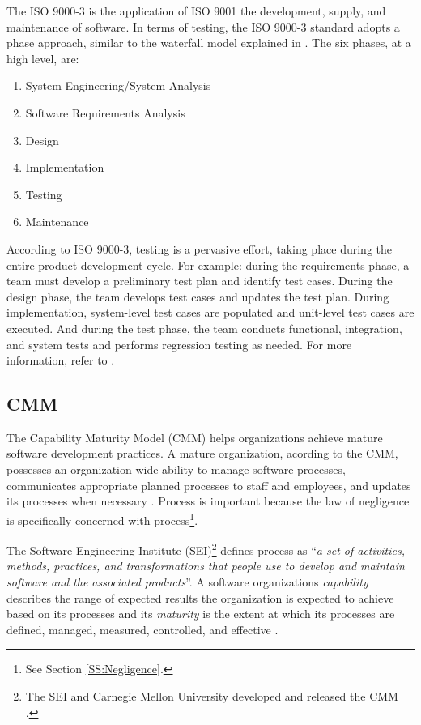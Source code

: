 The ISO 9000-3 is the application of ISO 9001 the development, supply, and
maintenance of software. In terms of testing, the ISO 9000-3 standard adopts a
phase approach, similar to the waterfall model explained in \cite{Royce70}. The
six phases, at a high level, are:
\singlespace
\begin{enumerate}
  \item System Engineering/System Analysis
  \item Software Requirements Analysis
  \item Design
  \item Implementation
  \item Testing
  \item Maintenance
\end{enumerate}
\doublespace
According to ISO 9000-3, testing is a pervasive effort, taking place during the
entire product-development cycle. For example: during the requirements phase, a
team must develop a preliminary test plan and identify test cases. During the
design phase, the team develops test cases and updates the test plan. During
implementation, system-level test cases are populated and unit-level test cases
are executed. And during the test phase, the team conducts functional,
integration, and system tests and performs regression testing as needed. For
more information, refer to \cite{Kehoe96}.

\subsection{CMM}
The Capability Maturity Model (CMM) helps organizations achieve mature software
development practices. A mature organization, acording to the CMM, possesses an
organization-wide ability to manage software processes, communicates appropriate
planned processes to staff and employees, and updates its processes when
necessary \cite{CMM11}. Process is important because the law of negligence is
specifically concerned with process\footnote{See Section \ref{SS:Negligence}.}.

The Software Engineering Institute (SEI)\footnote{The SEI and Carnegie Mellon
University developed and released the CMM \cite{CMM11}.} defines process as
``\textit{a set of activities, methods, practices, and transformations that 
people use to develop and maintain software and the associated 
products}''\cite{CMM11}. A software organizations \textit{capability} describes
the range of expected results the organization is expected to achieve based on
its processes and its \textit{maturity} is the extent at which its processes are
defined, managed, measured, controlled, and effective \cite{CMM11}.

